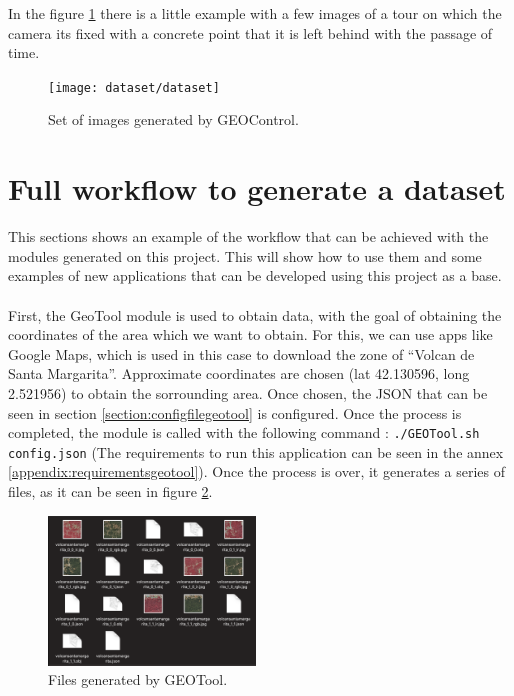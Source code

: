 \documentclass[10pt,a4paper,twocolumn,twoside]{article}
\begin{document}
In the figure \ref{fig-dataset} there is a little example with a few images of a tour on which the camera its fixed with a concrete point that it is left behind with the passage of time.

\begin{figure}[!h]
\centering
  	\texttt{[image: dataset/dataset]}
	\caption{Set of images generated by GEOControl.}
	\label{fig-dataset}
\end{figure}

\section{Full workflow to generate a dataset}

This sections shows an example of the workflow that can be achieved with the modules generated on this project. This will show how to use them and some examples of new applications that can be developed using this project as a base.
\\
\\
First, the GeoTool module is used to obtain data, with the goal of obtaining the coordinates of the area which we want to obtain. For this, we can use apps like Google Maps, which is used in this case to download the zone of ``Volcan de Santa Margarita''. Approximate coordinates are chosen (lat 42.130596, long 2.521956) to obtain the sorrounding area. Once chosen, the JSON that can be seen in section \ref{section:configfilegeotool} is configured. Once the process is completed, the module is called with the following command : {\tt ./GEOTool.sh config.json} (The requirements to run this application can be seen in the annex \ref{appendix:requirementsgeotool}). Once the process is over, it generates a series of files, as it can be seen in figure \ref{fig-filesgeotool}.

\begin{figure}[!h]
\centering
  	\includegraphics[width=0.49\textwidth]{filesgeotool}
	\caption{Files generated by GEOTool.}
	\label{fig-filesgeotool}
\end{figure}
\end{document}
